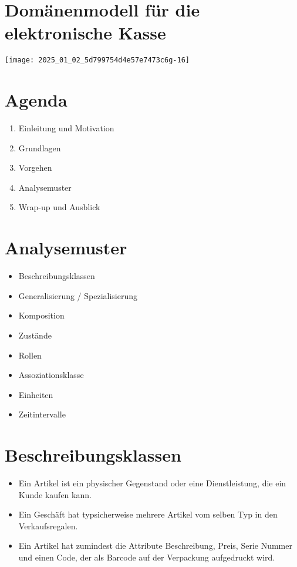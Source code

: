 \documentclass[10pt]{article}
\begin{document}
\section*{Domänenmodell für die elektronische Kasse}
\begin{center}
\texttt{[image: 2025\_01\_02\_5d799754d4e57e7473c6g-16]}
\end{center}

\section*{Agenda}
\begin{enumerate}
  \item Einleitung und Motivation
  \item Grundlagen
  \item Vorgehen
  \item Analysemuster
  \item Wrap-up und Ausblick
\end{enumerate}

\section*{Analysemuster}
\begin{itemize}
  \item Beschreibungsklassen
  \item Generalisierung / Spezialisierung
  \item Komposition
  \item Zustände
  \item Rollen
  \item Assoziationsklasse
  \item Einheiten
  \item Zeitintervalle
\end{itemize}

\section*{Beschreibungsklassen}
\begin{itemize}
  \item Ein Artikel ist ein physischer Gegenstand oder eine Dienstleistung, die ein Kunde kaufen kann.
  \item Ein Geschäft hat typsicherweise mehrere Artikel vom selben Typ in den Verkaufsregalen.
  \item Ein Artikel hat zumindest die Attribute Beschreibung, Preis, Serie Nummer und einen Code, der als Barcode auf der Verpackung aufgedruckt wird.
\end{itemize}
\end{document}
